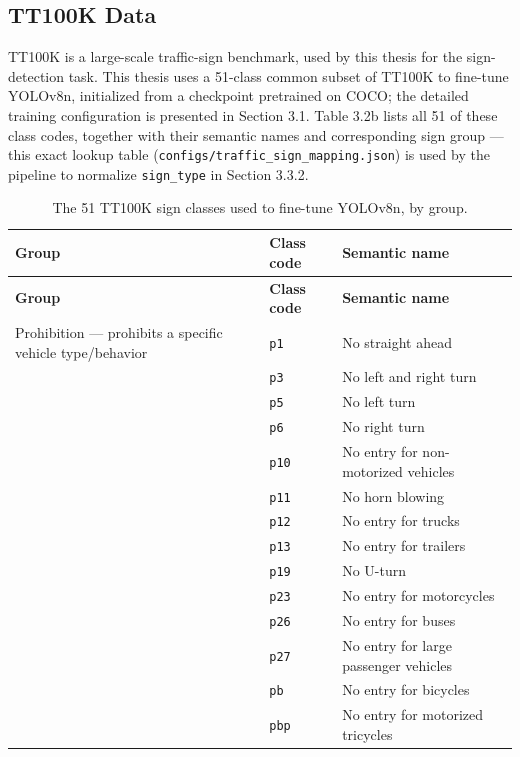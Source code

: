 \documentclass[12pt,a4paper]{report}
\begin{document}
\subsection{TT100K Data}

TT100K \cite{zhu2016tt100k} is a large-scale traffic-sign benchmark, used by this thesis for the sign-detection task. This thesis uses a 51-class common subset of TT100K to fine-tune YOLOv8n, initialized from a checkpoint pretrained on COCO; the detailed training configuration is presented in Section 3.1. Table 3.2b lists all 51 of these class codes, together with their semantic names and corresponding sign group --- this exact lookup table (\texttt{configs/traffic\_sign\_mapping.json}) is used by the pipeline to normalize \texttt{sign\_type} in Section 3.3.2.

\begin{longtable}{@{}p{4.2cm}p{2.4cm}p{6.5cm}@{}}
    \caption{The 51 TT100K sign classes used to fine-tune YOLOv8n, by group.}
    \label{tab:3.2b} \\
    \toprule
    \textbf{Group} & \textbf{Class code} & \textbf{Semantic name} \\
    \midrule
    \endfirsthead
    \toprule
    \textbf{Group} & \textbf{Class code} & \textbf{Semantic name} \\
    \midrule
    \endhead
    Prohibition --- prohibits a specific vehicle type/behavior & \texttt{p1} & No straight ahead \\
     & \texttt{p3} & No left and right turn \\
     & \texttt{p5} & No left turn \\
     & \texttt{p6} & No right turn \\
     & \texttt{p10} & No entry for non-motorized vehicles \\
     & \texttt{p11} & No horn blowing \\
     & \texttt{p12} & No entry for trucks \\
     & \texttt{p13} & No entry for trailers \\
     & \texttt{p19} & No U-turn \\
     & \texttt{p23} & No entry for motorcycles \\
     & \texttt{p26} & No entry for buses \\
     & \texttt{p27} & No entry for large passenger vehicles \\
     & \texttt{pb} & No entry for bicycles \\
     & \texttt{pbp} & No entry for motorized tricycles \\

\end{longtable}
\end{document}
